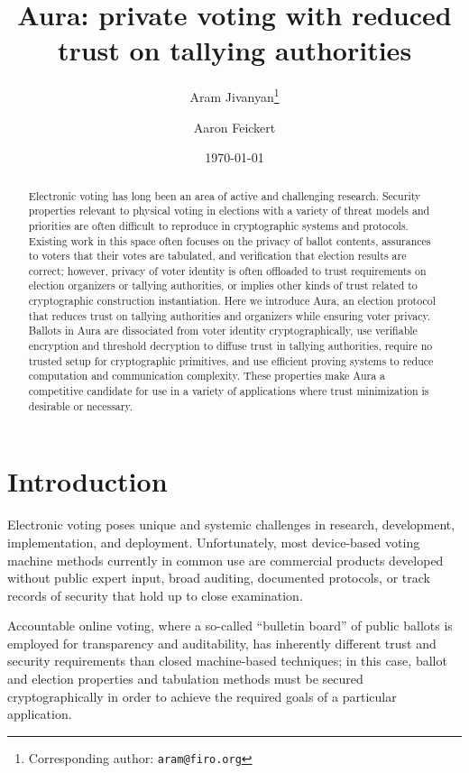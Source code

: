 \documentclass{article}
\title{Aura: private voting with reduced trust on tallying authorities}
\author[1,2]{Aram Jivanyan\thanks{Corresponding author: \texttt{aram@firo.org}}}
\author[3]{Aaron Feickert}
\affil[1]{Firo}
\affil[2]{Yerevan State University}
\affil[3]{Cypher Stack}
\date{\today}
\begin{document}
\maketitle

\begin{abstract}
	Electronic voting has long been an area of active and challenging research.
	Security properties relevant to physical voting in elections with a variety of threat models and priorities are often difficult to reproduce in cryptographic systems and protocols.
	Existing work in this space often focuses on the privacy of ballot contents, assurances to voters that their votes are tabulated, and verification that election results are correct; however, privacy of voter identity is often offloaded to trust requirements on election organizers or tallying authorities, or implies other kinds of trust related to cryptographic construction instantiation.
	Here we introduce Aura, an election protocol that reduces trust on tallying authorities and organizers while ensuring voter privacy.
	Ballots in Aura are dissociated from voter identity cryptographically, use verifiable encryption and threshold decryption to diffuse trust in tallying authorities, require no trusted setup for cryptographic primitives, and use efficient proving systems to reduce computation and communication complexity.
	These properties make Aura a competitive candidate for use in a variety of applications where trust minimization is desirable or necessary.
\end{abstract}


\section{Introduction}

Electronic voting poses unique and systemic challenges in research, development, implementation, and deployment.
Unfortunately, most device-based voting machine methods currently in common use are commercial products developed without public expert input, broad auditing, documented protocols, or track records of security that hold up to close examination.

Accountable online voting, where a so-called ``bulletin board'' of public ballots is employed for transparency and auditability, has inherently different trust and security requirements than closed machine-based techniques; in this case, ballot and election properties and tabulation methods must be secured cryptographically in order to achieve the required goals of a particular application.
\end{document}
